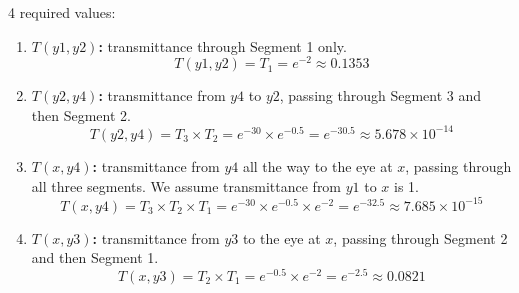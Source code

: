 \documentclass[11pt,addpoints,answers]{exam}
\begin{document}
\begin{questions}
\begin{tcolorbox}[fit,height=20cm, width=\textwidth, blank, borderline={0.5pt}{-2pt},halign=left, valign=center, nobeforeafter]
\begin{studentsolution}
    4 required values:
    \begin{enumerate}
        \item \textbf{$T(y1, y2)$:} transmittance through Segment 1 only.
        \[ T(y1, y2) = T_1 = e^{-2} \approx 0.1353 \]
    
        \item \textbf{$T(y2, y4)$:} transmittance from $y4$ to $y2$, passing through Segment 3 and then Segment 2.
        \[ T(y2, y4) = T_3 \times T_2 = e^{-30} \times e^{-0.5} = e^{-30.5} \approx 5.678 \times 10^{-14} \]
    
        \item \textbf{$T(x, y4)$:} transmittance from $y4$ all the way to the eye at $x$, passing through all three segments. We assume transmittance from $y1$ to $x$ is 1.
        \[ T(x, y4) = T_3 \times T_2 \times T_1 = e^{-30} \times e^{-0.5} \times e^{-2} = e^{-32.5} \approx 7.685 \times 10^{-15} \]
    
        \item \textbf{$T(x, y3)$:} transmittance from $y3$ to the eye at $x$, passing through Segment 2 and then Segment 1.
        \[ T(x, y3) = T_2 \times T_1 = e^{-0.5} \times e^{-2} = e^{-2.5} \approx 0.0821 \]
    \end{enumerate}
    \end{studentsolution}

\end{tcolorbox}
\end{questions}
\end{document}
